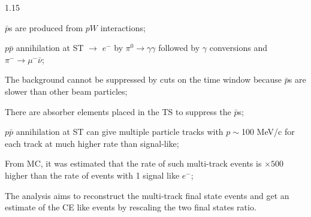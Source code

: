 \documentclass{beamer}
\begin{document}
\begin{frame}
    \begin{columns}
    \begin{column}{1.15\framewidth}
        \begin{itemize}
           {\small \item $\bar{p}$s are produced from $pW$ interactions;
           \vspace{-1mm}
           \item $p\bar{p}$ annihilation at ST $\rightarrow$ $e^-$ by $\pi^0\rightarrow \gamma \gamma$ followed by $\gamma$ 
           conversions and $\pi^- \rightarrow \mu^- \bar{\nu}$;
           \vspace{-1mm}
           \item The background cannot be suppressed by cuts on the time window because $\bar{p}$s are slower than other
           beam particles;
           \vspace{-1mm}
           \item There are absorber elements placed in the TS to suppress the $\bar{p}$s;
           \vspace{-1mm}
           \item  $p\bar{p}$ annihilation at ST can give multiple particle tracks with $p \sim$100 MeV/c for each track at much
           higher rate than signal-like;
           \vspace{-1mm}
           \item From MC, it was estimated that the rate of such multi-track
           events is $\times 500$ higher than the rate of events with 1 signal like
           $e^-$;
           \vspace{-1mm}
           \item The analysis aims to reconstruct the multi-track final 
           state events and get an estimate of the CE like events by rescaling the two final states ratio.
            }
        \end{itemize}
    \end{column}
    \end{columns}
\end{frame}
\end{document}
